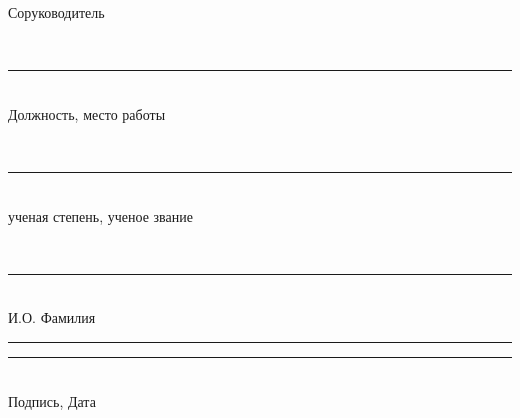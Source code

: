 \begin{titlepage}
\ifhseHasCoSupervisor
\vspace{0.35cm}

\noindent
\begin{minipage}[t]{0.42\textwidth}
\raggedright
Соруководитель

\vspace{0.18cm}
\strut\hseCoSupervisorTitle\\[-0.05cm]
\rule{6.1cm}{0.4pt}\\[-0.05cm]
{\scriptsize Должность, место работы}

\vspace{0.08cm}
\strut\hseCoSupervisorDegree\\[-0.05cm]
\rule{6.1cm}{0.4pt}\\[-0.05cm]
{\scriptsize ученая степень, ученое звание}

\vspace{0.08cm}
\strut\hseCoSupervisorName\\[-0.05cm]
\rule{6.1cm}{0.4pt}\\[-0.05cm]
{\scriptsize И.О. Фамилия}

\vspace{0.08cm}
\rule{3.6cm}{0.4pt}\quad\rule{2.2cm}{0.4pt}\\[-0.05cm]
{\scriptsize Подпись, Дата}
\end{minipage}
\hfill
\begin{minipage}[t]{0.42\textwidth}
\strut
\end{minipage}
\fi

\vfill

\begin{center}
\textbf{\hseCity{} \hseYear}
\end{center}
\end{titlepage}


\setcounter{page}{2}
\clearpage
